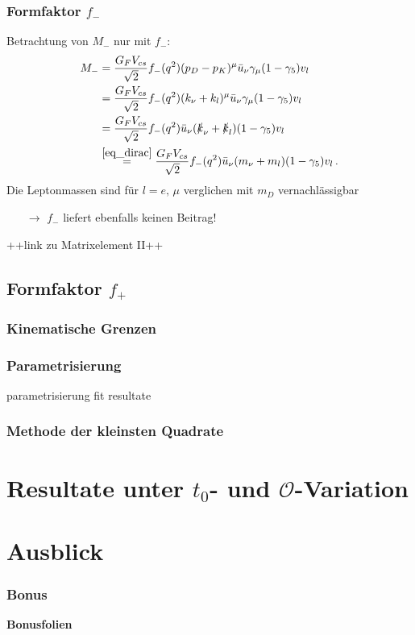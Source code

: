 \documentclass[hyperref={pdfpagelabels=false}]{beamer}
\begin{document}
\begin{frame}
 \frametitle{Formfaktor $f_-$}
 Betrachtung von $M_-$ nur mit $f_-$:
 \begin{align}
  M_- &= \frac{G_F V_{cs}}{\sqrt{2}} f_-(q^2)(p_D-p_K)^\mu\bar u_\nu \gamma_\mu(1-\gamma_5)v_l\nonumber\\
 &= \frac{G_F V_{cs}}{\sqrt{2}} f_-(q^2)(k_\nu+k_l)^\mu \bar u_\nu \gamma_\mu(1-\gamma_5)v_l\,\nonumber\\
  &=\frac{G_F V_{cs}}{\sqrt{2}} f_-(q^2)\bar u_\nu (\slashed{k}_\nu + \slashed{k}_l) (1-\gamma_5)v_l\nonumber\\
 &\stackrel{\eqref{eq_dirac}}{=}\frac{G_F V_{cs}}{\sqrt{2}} f_-(q^2)\bar u_\nu (m_\nu + m_l) (1-\gamma_5)v_l\,.\nonumber 
 \end{align}
Die Leptonmassen sind für $l=e,\,\mu$ verglichen mit $m_D$ vernachlässigbar
\begin{itemize}
 \item [$\rightarrow$] $f_-$ liefert ebenfalls keinen Beitrag!
\end{itemize}
++link zu Matrixelement II++

\end{frame}


\subsection{Formfaktor $f_+$}
\begin{frame}
 \frametitle{Kinematische Grenzen}
\end{frame}

\begin{frame}
\frametitle{Parametrisierung}
parametrisierung
fit
resultate
\end{frame}

\begin{frame}
 \frametitle{Methode der kleinsten Quadrate}
\end{frame}

\section{Resultate unter $t_0$- und $\mathcal{O}$-Variation}
\begin{frame}
\tableofcontents[currentsection]
\end{frame}



\section{Ausblick}
\label{sec_ausblick}
\begin{frame}
\tableofcontents[currentsection]
\end{frame}


\begin{frame}
\frametitle{Bonus}
\textbf{Bonusfolien}
\end{frame}
\end{document}
